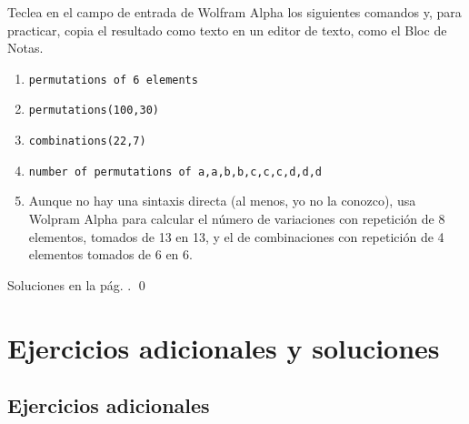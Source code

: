\documentclass[10pt,a4paper]{article}\usepackage[]{graphicx}\usepackage[]{color}
\begin{document}
\begin{ejercicio}
\label{tut03:ejercicio15}
\quad
Teclea en el campo de entrada de Wolfram Alpha los siguientes comandos y, para practicar, copia el resultado como texto en un editor de texto, como el Bloc de Notas.
\begin{enumerate}
\item {\tt permutations of 6 elements}
\item {\tt permutations(100,30)}
\item {\tt combinations(22,7)}
\item {\tt number of permutations of {a,a,b,b,c,c,c,d,d,d}}
\item Aunque no hay una sintaxis directa (al menos, yo no la conozco), usa Wolpram Alpha para calcular el número de variaciones con repetición de 8 elementos, tomados de 13 en 13, y el de combinaciones con repetición de 4 elementos tomados de 6 en 6.
\end{enumerate}
Soluciones en la pág. \pageref{tut03:ejercicio15:sol}.
\qed
\end{ejercicio}


\section{Ejercicios adicionales y soluciones}
\label{tut03:sec:SolucionesEjerciciosAdicionales}

\subsection*{Ejercicios adicionales}
\label{tut03:subsec:EjerciciosAdicionales}
\end{document}
